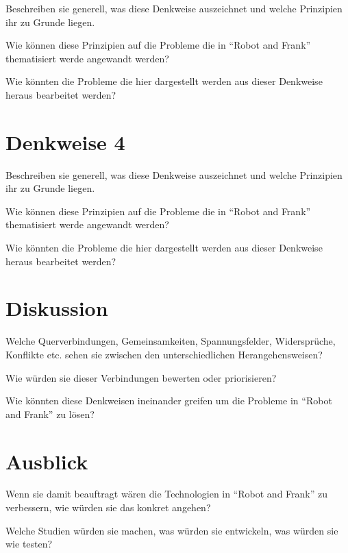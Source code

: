 \documentclass[sigchi-a, authorversion]{acmart}
\begin{document}
Beschreiben sie generell, was diese Denkweise auszeichnet und welche Prinzipien ihr zu Grunde liegen.

Wie können diese Prinzipien auf die Probleme die in ``Robot and Frank'' thematisiert werde angewandt werden?

Wie könnten die Probleme die hier dargestellt werden aus dieser Denkweise heraus bearbeitet werden?

\section{Denkweise 4}

Beschreiben sie generell, was diese Denkweise auszeichnet und welche Prinzipien ihr zu Grunde liegen.

Wie können diese Prinzipien auf die Probleme die in ``Robot and Frank'' thematisiert werde angewandt werden?

Wie könnten die Probleme die hier dargestellt werden aus dieser Denkweise heraus bearbeitet werden?


\section{Diskussion}

Welche Querverbindungen, Gemeinsamkeiten, Spannungsfelder, Widersprüche, Konflikte etc. sehen sie zwischen den unterschiedlichen Herangehensweisen?

Wie würden sie dieser Verbindungen bewerten oder priorisieren?

Wie könnten diese Denkweisen ineinander greifen um die Probleme in ``Robot and Frank'' zu lösen?

\section{Ausblick}

Wenn sie damit beauftragt wären die Technologien in ``Robot and Frank'' zu verbessern, wie würden sie das konkret angehen?

Welche Studien würden sie machen, was würden sie entwickeln, was würden sie wie testen?






\end{document}
